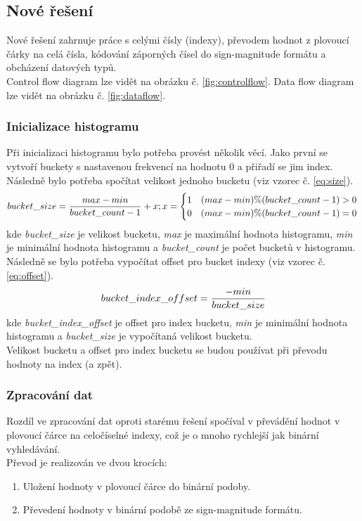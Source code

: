 \documentclass[12pt, a4paper]{article}
\begin{document}
\subsection{Nové řešení}
Nové řešení zahrnuje práce s celými čísly (indexy), převodem hodnot z plovoucí čárky na celá čísla, kódování záporných čísel do sign-magnitude formátu a obcházení datových typů.\\
\indent Control flow diagram lze vidět na obrázku č. \ref{fig:controlflow}. Data flow diagram lze vidět na obrázku č. \ref{fig:dataflow}.

\subsubsection{Inicializace histogramu}
Při inicializaci histogramu bylo potřeba provést několik věcí. Jako první se vytvoří buckety s nastavenou frekvencí na hodnotu 0 a přiřadí se jim index. Následně bylo potřeba spočítat velikost jednoho bucketu (viz vzorec č. \ref{eq:size}).
\begin{equation}
bucket\_size =  \frac{max - min}{bucket\_count - 1} + x; x = 
\begin{cases}
1	&	(max - min) \% (bucket\_count - 1) > 0	\\
0	& 	(max - min) \% (bucket\_count - 1) = 0
\end{cases} \\
\label{eq:size} 
\end{equation}
kde \textit{bucket\_size} je velikost bucketu, \textit{max} je maximální hodnota histogramu, \textit{min} je minimální hodnota histogramu a \textit{bucket\_count} je počet bucketů v histogramu.\\

\noindent Následně se bylo potřeba vypočítat offset pro bucket indexy (viz vzorec č. \ref{eq:offset}).
\begin{equation}
bucket\_index\_offset = \frac{-min}{bucket\_size}  \\
\label{eq:offset} 
\end{equation}
kde \textit{bucket\_index\_offset} je offset pro index bucketu, \textit{min} je minimální hodnota histogramu a \textit{bucket\_size} je vypočítaná velikost bucketu. \\


\noindent Velikost bucketu a offset pro index bucketu se budou používat při převodu hodnoty na index (a zpět).

\subsubsection{Zpracování dat} \label{sssec:new_zpracovani}
Rozdíl ve zpracování dat oproti starému řešení spočíval v převádění hodnot v plovoucí čárce na celočíselné indexy, což je o mnoho rychlejší jak binární vyhledávání. \\
Převod je realizován ve dvou krocích:
\begin{enumerate}
\item Uložení hodnoty v plovoucí čárce do binární podoby.
\item Převedení hodnoty v binární podobě ze sign-magnitude formátu.\\
\end{enumerate}
\end{document}
